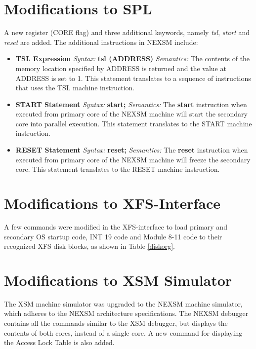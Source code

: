 \documentclass[12pt]{report}
\begin{document}
\section{Modifications to SPL}
A new register (CORE flag) and three additional keywords, namely \emph{tsl}, \emph{start} and \emph{reset} are added. The additional instructions in NEXSM include:
\begin{itemize}
    \item{\textbf{TSL Expression}
    \newline \emph{Syntax:} \textbf{tsl (ADDRESS)}
    \newline \emph{Semantics:} The contents of the memory location specified by ADDRESS is returned and the value at ADDRESS is set to 1. This statement translates to a sequence of instructions that uses the TSL machine instruction.}
    
    \item{\textbf{START Statement}
    \newline \emph{Syntax:} \textbf{start;}
    \newline \emph{Semantics:} The \textbf{start} instruction when executed from primary core of the NEXSM machine will start the secondary core into parallel execution. This statement translates to the START machine instruction.}
    
    \item{\textbf{RESET Statement}
    \newline \emph{Syntax:} \textbf{reset;}
    \newline \emph{Semantics:} The \textbf{reset} instruction when executed from primary core of the NEXSM machine will freeze the secondary core. This statement translates to the RESET machine instruction.}
\end{itemize}


\section{Modifications to XFS-Interface}
A few commands were modified in the XFS-interface to load primary and secondary OS startup code, INT 19 code and Module 8-11 code to their recognized XFS disk blocks, as shown in Table \ref{diskorg}.


\section{Modifications to XSM Simulator}
The XSM machine simulator was upgraded to the NEXSM machine simulator, which adheres to the NEXSM architecture specifications. The NEXSM debugger contains all the commands similar to the XSM debugger, but displays the contents of both cores, instead of a single core. A new command for displaying the Access Lock Table is also added.
\end{document}
